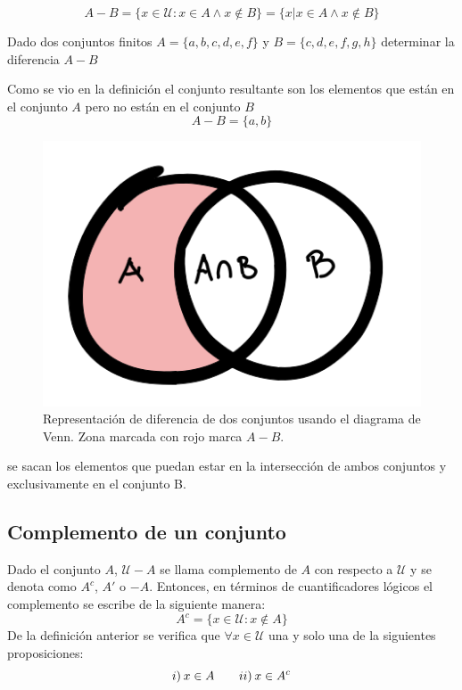 \begin{equation}
A-B =\{x\in\mathcal{U}:x\in A\wedge x\notin B\}=\{x|x\in A\wedge x\notin B\}
\label{dif0}
\end{equation}
\begin{myexample}
Dado dos conjuntos finitos $A=\{a,b,c,d,e,f\}$ y $B=\{c,d,e,f,g,h\}$ determinar la diferencia $A-B$
\end{myexample}
Como se vio en la definición el conjunto resultante son los elementos que están en el conjunto $A$ pero no están en el conjunto $B$
\begin{equation*}
A-B=\{a,b\}
\end{equation*}

\begin{center}
	\begin{figure}[ht!]
	\centering
    		\includegraphics[scale=0.35]{FiguresBM/diferenciac.png}
    		\caption[Representación de diferencia de dos conjuntos]{Representación de diferencia de dos conjuntos usando el diagrama de Venn. Zona marcada con rojo marca $A-B$.}
	\end{figure}
\end{center}

se sacan los elementos que puedan estar en la intersección de ambos conjuntos y exclusivamente en el conjunto B.

\subsection{Complemento de un conjunto}
Dado el conjunto $A$, $\mathcal{U}-A$ se llama complemento de $A$ con respecto a $\mathcal{U}$ y se denota como $A^{c}$, $A'$ o $-A$. Entonces, en términos de cuantificadores lógicos el complemento se escribe de la siguiente manera:
\begin{equation}
A^{c}=\{x\in\mathcal{U}:x\notin A\}
\end{equation}
De la definición anterior se verifica que $\forall x\in\mathcal{U}$  una y solo una de la siguientes proposiciones:
\begin{equation*}
i)\hspace{2px} x\in A \hspace{20px} ii)\hspace{2px} x\in A^{c}
\end{equation*}

